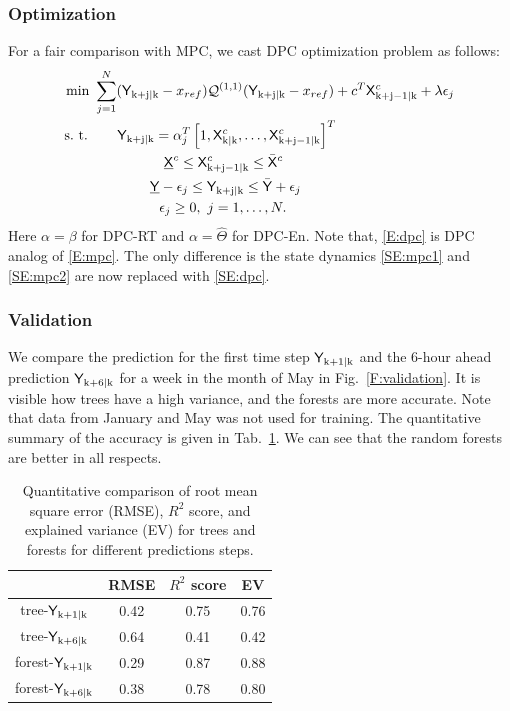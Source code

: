 \subsubsection{Optimization} 
\label{SSS:dpc_opt}
For a fair comparison with MPC, we cast DPC optimization problem as follows:
\begin{subequations}
\begin{align}
\text{min } & \sum_{j=1}^{N} ({\mathsf{Y}}_{\mathrm{k+j|k}} - x_{ref}) \mathcal{Q}^{(1,1)} ({\mathsf{Y}}_{\mathrm{k+j|k}} - x_{ref}) + c^T \mathsf{X}^c_{\mathrm{k+j-1|k}}+  \lambda\epsilon_j\\
\text{s.~t. } & \ \ \ \ \ \mathsf{Y}_{\mathrm{k+j|k}} =  \alpha_j^T \left[1,\mathsf{X}^c_{\mathrm{k|k}},\dots,\mathsf{X}^c_{\mathrm{k+j-1|k}} \right]^T \label{SE:dpc}\\
& \ \ \ \ \ \ \ \ \ \ \ \ \ \ \ \underline{\mathsf{X}}^c \leq \mathsf{X}^c_{\mathrm{k+j-1|k}} \leq \bar{\mathsf{X}}^c\\ 
& \ \ \ \ \ \ \ \ \ \ \ \ \underline{\mathsf{Y}}-\epsilon_j \leq \mathsf{Y}_{\mathrm{k+j|k}} \leq \bar{\mathsf{Y}} + \epsilon_j\\\
& \ \ \ \ \ \ \ \ \ \ \ \ \ \ \epsilon_j \geq 0, \ j = 1,\dots,N.
\end{align} \label{E:dpc}
\end{subequations}
\noindent Here $\alpha = \beta$ for DPC-RT and $\alpha = \hat{\Theta}$ for DPC-En.
Note that, \eqref{E:dpc} is DPC analog of \eqref{E:mpc}. The only difference is the state dynamics \eqref{SE:mpc1} and \eqref{SE:mpc2} are now replaced with \eqref{SE:dpc}.

\subsubsection{Validation} 
\label{SSS:dpc_val}

We compare the prediction for the first time step $\mathsf{Y}_{\mathrm{k+1|k}}$ and the 6-hour ahead prediction $\mathsf{Y}_{\mathrm{k+6|k}}$ for a week in the month of May in Fig.~\ref{F:validation}. It is visible how trees have a high variance, and the forests are more accurate. Note that data from January and May was not used for training. The quantitative summary of the accuracy is given in Tab.~\ref{T:validation}. We can see that the random forests are better in all respects.
\begin{table}[h!]
	\centering
	\begin{tabular}{cccc}
		\toprule
		& RMSE & $R^2$ score & EV  \\ 
		\midrule
		tree-$\mathsf{Y}_{\mathrm{k+1|k}}$    &  0.42 &  0.75 & 0.76    \\
		tree-$\mathsf{Y}_{\mathrm{k+6|k}}$  & 0.64 &  0.41  & 0.42 \\
		forest-$\mathsf{Y}_{\mathrm{k+1|k}}$  & 0.29 & 0.87  & 0.88 \\
		forest-$\mathsf{Y}_{\mathrm{k+6|k}}$  & 0.38 & 0.78 & 0.80 \\
		\bottomrule
	\end{tabular}
	\caption{Quantitative comparison of root mean square error (RMSE), $R^2$ score, and explained variance (EV) for trees and forests for different predictions steps.}
	\captionsetup{justification=centering}
	\label{T:validation}
\end{table}

